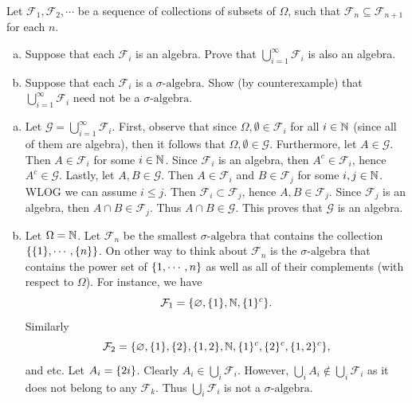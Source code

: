 \begin{problem}
	Let $ \mathcal{F}_1,\mathcal{F}_2,\cdots $ be a sequence of collections of subsets of $ \Omega $, such that $ \mathcal{F}_n \subseteq \mathcal{F}_{n+1} $ for each $ n $. 
	\begin{enumerate}[(a)]
		\item Suppose that each $ \mathcal{F}_i $ is an algebra. Prove that $ \bigcup_{i=1}^\infty \mathcal{F}_i $ is also an algebra. 
		\item Suppose that each $ \mathcal{F}_i $ is a $\sigma\text{-algebra}$. Show (by counterexample) that $ \bigcup_{i=1}^\infty  \mathcal{F}_i$ need not be a $\sigma\text{-algebra}$.
	\end{enumerate}
\end{problem}
\begin{solution}
	\begin{enumerate}[(a)]
		\item Let $ \mathcal{G} = \bigcup_{i=1}^\infty \mathcal{F}_i $. First, observe that since $ \Omega, \emptyset \in \mathcal{F}_i $ for all $ i\in \mathbb{N} $ (since all of them are algebra), then it follows that $ \Omega, \emptyset \in \mathcal{G} $. Furthermore, let $ A \in \mathcal{G} $. Then $ A \in \mathcal{F}_i $ for some $ i\in\mathbb{N} $. Since $ \mathcal{F}_i $ is an algebra, then $ A^c \in \mathcal{F}_i $, hence $ A^c \in \mathcal{G} $. Lastly, let $ A,B \in \mathcal{G} $. Then $ A\in\mathcal{F}_i $ and $ B \in \mathcal{F}_j $ for some $ i,j \in \mathbb{N} $. WLOG we can assume $ i \leq j $. Then $ \mathcal{F}_i \subset \mathcal{F}_j $, hence $ A,B \in \mathcal{F}_j $. Since $ \mathcal{F}_j $ is an algebra, then $ A\cap B \in \mathcal{F}_j $. Thus $ A \cap B \in \mathcal{G} $. This proves that $ \mathcal{G} $ is an algebra. 
		\item Let $ \Omega = \mathbb{N} $. Let $ \mathcal{F}_n $ be the smallest $\sigma\text{-algebra}$ that contains the collection $ \{\{1\},\cdots,\{n\}\} $. On other way to think about $ \mathcal{F}_n $ is the $\sigma\text{-algebra}$ that contains the power set of $ \{1,\cdots,n\} $ as well as all of their complements (with respect to $ \Omega $). For instance, we have
		\[ \mathcal{F}_1 = \{\varnothing,\{1\},\mathbb{N}, \{1\}^c\}. \]
		Similarly
		\[ \mathcal{F}_2 = \{\varnothing,\{1\},\{2\},\{1,2\},\mathbb{N},\{1\}^c,\{2\}^c,\{1,2\}^c\}, \]
		and etc. Let $ A_i = \{2 i\} $. Clearly $ A_i \in \bigcup_i \mathcal{F}_i $. However, $ \bigcup_i A_i \notin \bigcup_i \mathcal{F}_i$ as it does not belong to any $ \mathcal{F}_k $. Thus $ \bigcup_i\mathcal{F}_i $ is not a $\sigma\text{-algebra}$.
	\end{enumerate}
\end{solution}

